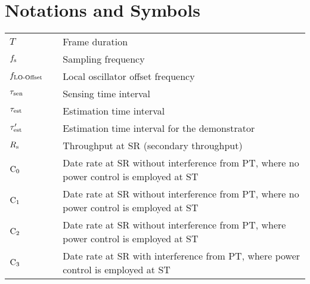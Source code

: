 
\chapter{Notations and Symbols}


\renewcommand{\arraystretch}{1.0}
\begin{longtable}{p{}p{}p{}}

       $T$                     & &             Frame duration \\
       $f_{\text{s}}$                 & &             Sampling frequency \\
       $f_{\text{LO-Offset}}$                  & & 	       Local oscillator offset frequency \\
       $\tau_{\text{sen}}$                 & &             Sensing time interval \\
       $\tau_{\text{est}}$                 & &             Estimation time interval \\      
       ${\tau}\sp{\prime}_{\text{est}}$               & &             Estimation time interval for the demonstrator \\      
       $R_{\text{s}}$                   & &             Throughput at SR (secondary throughput) \\
       $\text{C}_{\text{0}}$                   &  &      Date rate at SR without interference from PT, where no power control is employed at ST  \\
       $\text{C}_{\text{1}}$                   & &      Date rate at SR without interference from PT, where no power control is employed at ST \\ 
       $\text{C}_{\text{2}}$                   & &      Date rate at SR without interference from PT, where power control is employed at ST  \\
       $\text{C}_{\text{3}}$                   & &      Date rate at SR with interference from PT, where power control is employed at ST  \\ 


\end{longtable}
